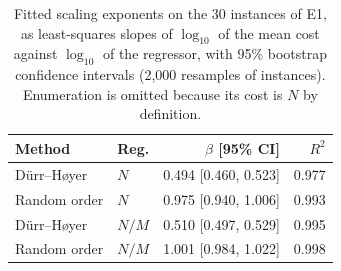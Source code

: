 \begin{table}[t]
\centering
\caption{Fitted scaling exponents on the 30 instances of E1, as least-squares slopes of $\log_{10}$ of the mean cost against $\log_{10}$ of the regressor, with 95\% bootstrap confidence intervals (2{,}000 resamples of instances). Enumeration is omitted because its cost is $N$ by definition.}\label{tab:fits}
\small
\begin{tabular}{llrr}
\toprule
Method & Reg. & $\beta$ [95\% CI] & $R^2$ \\
\midrule
Dürr--Høyer & $N$ & 0.494 [0.460, 0.523] & 0.977 \\
Random order & $N$ & 0.975 [0.940, 1.006] & 0.993 \\
Dürr--Høyer & $N/M$ & 0.510 [0.497, 0.529] & 0.995 \\
Random order & $N/M$ & 1.001 [0.984, 1.022] & 0.998 \\
\bottomrule
\end{tabular}
\end{table}
